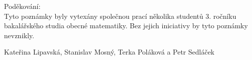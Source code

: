 \newpage
Poděkování:\\

Tyto poznámky byly vytexány společnou prací několika studentů 3. ročníku bakalářského studia obecné matematiky. Bez jejich iniciativy by tyto poznámky nevznikly. \\

\begin{flushright}
Kateřina Lipavská, Stanislav Mosný, Terka Poláková a Petr Sedláček
\end{flushright}
